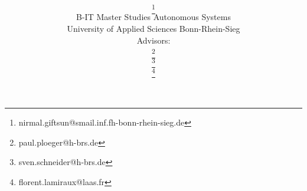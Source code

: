 \title{
{\PaperTitle}
\vspace{0.35cm}
\\
\PaperSubject
\vspace{0.40cm}
}
\author{\href{\PaperMainWriterEMail}
{\PaperMainWriter \footnote{\href{\PaperMainWriterEMail} {nirmal.giftsun@smail.inf.fh-bonn-rhein-sieg.de}}} 
\vspace{0.55cm} \\ 
B-IT Master Studies Autonomous Systems 
\vspace{0.25cm} \\ 
University of Applied Sciences Bonn-Rhein-Sieg 
\vspace{0.35cm} \\ 
\setcounter{footnote}{6}
Advisors:\vspace{0.15cm}\\ 
\href{\PaperLecturerEMail}{\PaperLecturerfirst \footnote{\href{\PaperLecturerEMail} {paul.ploeger@h-brs.de}}} \\  
\href{\PaperLecturerEMail}{\PaperLecturersecond \footnote{\href{\PaperLecturerEMail} {sven.schneider@h-brs.de}}}\\  
\href{\PaperLecturerEMail}{\PaperLecturerfirst \footnote{\href{\PaperLecturerEMail} {florent.lamiraux@laas.fr}}} \\  
}
\maketitle
